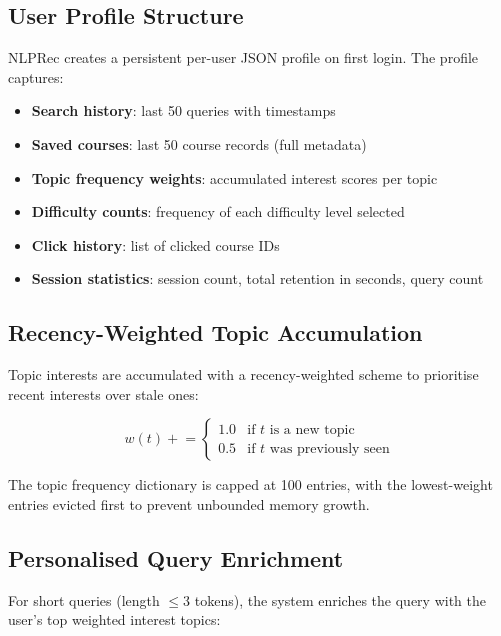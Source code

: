\documentclass[12pt, a4paper]{article}
\begin{document}
\subsection{User Profile Structure}

NLPRec creates a persistent per-user JSON profile on first login. The profile captures:
\begin{itemize}
    \item \textbf{Search history}: last 50 queries with timestamps
    \item \textbf{Saved courses}: last 50 course records (full metadata)
    \item \textbf{Topic frequency weights}: accumulated interest scores per topic
    \item \textbf{Difficulty counts}: frequency of each difficulty level selected
    \item \textbf{Click history}: list of clicked course IDs
    \item \textbf{Session statistics}: session count, total retention in seconds, query count
\end{itemize}

\subsection{Recency-Weighted Topic Accumulation}

Topic interests are accumulated with a recency-weighted scheme to prioritise recent interests
over stale ones:

\begin{equation}
    w(t) \mathrel{+}= \begin{cases}
        1.0 & \text{if } t \text{ is a new topic} \\
        0.5 & \text{if } t \text{ was previously seen}
    \end{cases}
    \label{eq:topicweight}
\end{equation}

The topic frequency dictionary is capped at 100 entries, with the lowest-weight entries evicted
first to prevent unbounded memory growth.

\subsection{Personalised Query Enrichment}

For short queries (length $\leq 3$ tokens), the system enriches the query with the user's top
weighted interest topics:
\end{document}
